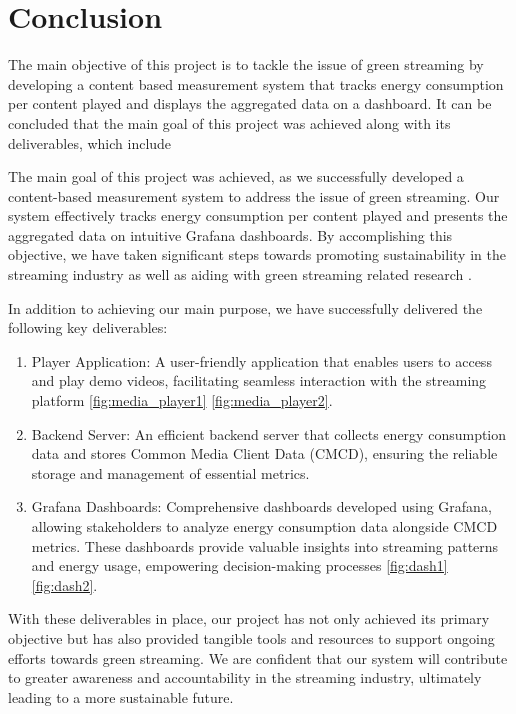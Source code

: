 \label{sec:conclusion}

\section{Conclusion}

The main objective of this project is to tackle the issue of green streaming by developing a content based measurement system that tracks energy consumption per content played and displays the aggregated data on a dashboard. It can be concluded that the main goal of this project was achieved along with its deliverables, which include 

The main goal of this project was achieved, as we successfully developed a content-based measurement system to address the issue of green streaming. Our system effectively tracks energy consumption per content played and presents the aggregated data on intuitive Grafana dashboards. By accomplishing this objective, we have taken significant steps towards promoting sustainability in the streaming industry as well as aiding with green streaming related research .

In addition to achieving our main purpose, we have successfully delivered the following key deliverables:

\begin{enumerate}
  \item Player Application: A user-friendly application that enables users to access and play demo videos, facilitating seamless interaction with the streaming platform \ref{fig:media_player1} \ref{fig:media_player2}.
  \item Backend Server: An efficient backend server that collects energy consumption data and stores Common Media Client Data (CMCD), ensuring the reliable storage and management of essential metrics.
  \item Grafana Dashboards: Comprehensive dashboards developed using Grafana, allowing stakeholders to analyze energy consumption data alongside CMCD metrics. These dashboards provide valuable insights into streaming patterns and energy usage, empowering decision-making processes \ref{fig:dash1} \ref{fig:dash2}.
\end{enumerate}

With these deliverables in place, our project has not only achieved its primary objective but has also provided tangible tools and resources to support ongoing efforts towards green streaming. We are confident that our system will contribute to greater awareness and accountability in the streaming industry, ultimately leading to a more sustainable future.
